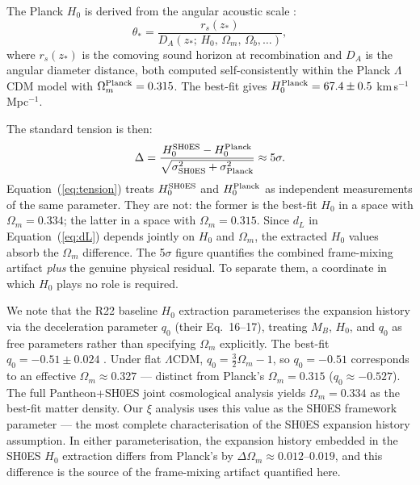 \documentclass[usenatbib]{mnras}
\begin{document}
The Planck $H_0$ is derived from the angular acoustic scale
\citep[][their Section~5.4, Table~2]{planck2020}:
\begin{equation}
\theta_* = \frac{r_s(z_*)}{D_A(z_*;\,H_0,\,\Omega_m,\,\Omega_b,\ldots)},
\label{eq:theta}
\end{equation}
where $r_s(z_*)$ is the comoving sound horizon at recombination and
$D_A$ is the angular diameter distance, both computed self-consistently
within the Planck $\Lambda$CDM model with $\Omega_m^{\rm Planck} = 0.315$.
The best-fit gives $H_0^{\rm Planck} = 67.4 \pm 0.5$
km\,s$^{-1}$\,Mpc$^{-1}$.

The standard tension is then:
\begin{equation}
\Delta = \frac{H_0^{\rm SH0ES} - H_0^{\rm Planck}}{\sqrt{\sigma_{\rm SH0ES}^2 + \sigma_{\rm Planck}^2}} \approx 5\sigma.
\label{eq:tension}
\end{equation}
Equation~(\ref{eq:tension}) treats $H_0^{\rm SH0ES}$ and $H_0^{\rm Planck}$
as independent measurements of the same parameter. They are not: the former
is the best-fit $H_0$ in a space with $\Omega_m = 0.334$; the latter in a
space with $\Omega_m = 0.315$. Since $d_L$ in Equation~(\ref{eq:dL}) depends
jointly on $H_0$ and $\Omega_m$, the extracted $H_0$ values absorb the
$\Omega_m$ difference. The 5$\sigma$ figure quantifies the combined
frame-mixing artifact \emph{plus} the genuine physical residual. To
separate them, a coordinate in which $H_0$ plays no role is required.

We note that the R22 baseline $H_0$ extraction parameterises the expansion
history via the deceleration parameter $q_0$ (their Eq.~16--17), treating
$M_B$, $H_0$, and $q_0$ as free parameters rather than specifying $\Omega_m$
explicitly. The best-fit $q_0 = -0.51 \pm 0.024$ \citep[][their
Section~5.2]{riess2022}. Under flat $\Lambda$CDM, $q_0 = \tfrac{3}{2}\Omega_m - 1$,
so $q_0 = -0.51$ corresponds to an effective $\Omega_m \approx 0.327$ ---
distinct from Planck's $\Omega_m = 0.315$ ($q_0 \approx -0.527$).
The full Pantheon+SH0ES joint cosmological analysis \citep{brout2022} yields
$\Omega_m = 0.334$ as the best-fit matter density. Our $\xi$ analysis uses
this value as the SH0ES framework parameter --- the most complete
characterisation of the SH0ES expansion history assumption. In either
parameterisation, the expansion history embedded in the SH0ES $H_0$
extraction differs from Planck's by $\Delta\Omega_m \approx 0.012$--$0.019$,
and this difference is the source of the frame-mixing artifact quantified
here.
\end{document}
